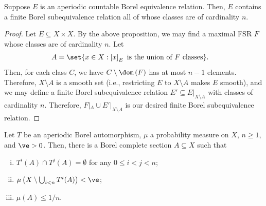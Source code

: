 \documentclass[10pt]{mypackage}
\begin{document}
\begin{corollary}
  Suppose $E$ is an aperiodic countable Borel equivalence relation. Then, $E$ contains a finite Borel subequivalence relation all of whose classes are of cardinality $n$.
\end{corollary}
\begin{proof}
  Let $E\subseteq X\times X$. By the above proposition, we may find a maximal FSR $F$ whose classes are of cardinality $n$. Let
  \begin{align*}
    A &= \set{x\in X : \left[ x \right]_E\text{ is the union of }F\text{ classes}}.
  \end{align*}
  Then, for each class $C$, we have $C\setminus \dom\left( F \right)$ has at most $n-1$ elements. Therefore, $X\setminus A$ is a smooth set (i.e., restricting $E$ to $X\setminus A$ makes $E$ smooth), and we may define a finite Borel subequivalence relation $E'\subseteq E|_{X\setminus A}$ with classes of cardinality $n$. Therefore, $F|_{A}\cup E'|_{X\setminus A}$ is our desired finite Borel subequivalence relation.
\end{proof}
\begin{theorem}
  Let $T$ be an aperiodic Borel automorphism, $\mu$ a probability measure on $X$, $n\geq 1$, and $\ve > 0$. Then, there is a Borel complete section $A\subseteq X$ such that
  \begin{enumerate}[(i)]
    \item $T^{i}(A)\cap T^{j}(A) = \emptyset$ for any $0\leq i < j < n$;
    \item $\mu\left( X\setminus \bigcup_{i < n}T^{i}(A) \right) < \ve$;
    \item $\mu(A)\leq 1/n$.
  \end{enumerate}
\end{theorem}
\end{document}

